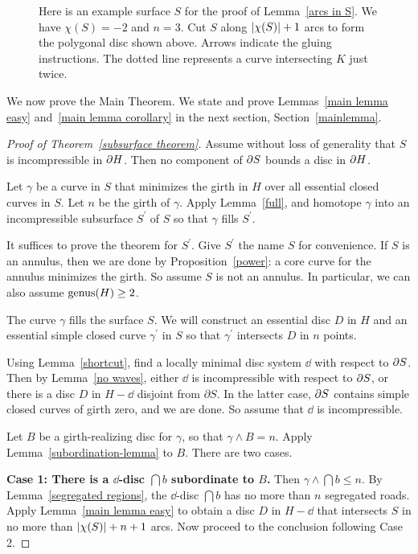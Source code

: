 \begin{figure}
\caption{Here is an example surface $S$ for the proof of Lemma~\ref{arcs in S}.  We have $\chi(S)=-2$ and $n=3$.  Cut $S$ along $| \chi (S) |+1$ arcs to form the polygonal disc shown above.  Arrows indicate the gluing instructions.  The dotted line represents a curve intersecting $K$ just twice.
}
\label{polygonarcs}
\end{figure}

We now prove the Main Theorem.  We state and prove 
Lemmas~\ref{main lemma easy} and~\ref{main lemma corollary} 
in the next section, Section~\ref{mainlemma}.

\begin{proof}[Proof of Theorem~\ref{subsurface theorem}]
Assume without loss of generality that $S$ is incompressible in $\partial H$.  Then no component of $\partial S$ bounds a disc in $\partial H$.

Let $\gamma$ be a curve in $S$ that minimizes the girth in $H$ over all essential closed curves in $S$.  Let $n$ be the girth of $\gamma$.  Apply Lemma~\ref{full}, and homotope $\gamma$ into an incompressible subsurface $S^\prime$ of $S$ so that $\gamma$ fills $S^\prime$.

It suffices to prove the theorem for $S^\prime$.  Give $S^\prime$ the name $S$ for convenience.  If $S$ is an annulus, then we are done by Proposition~\ref{power}: a core curve for the annulus minimizes the girth.  So assume $S$ is not an annulus.  In particular, we can also assume $\operatorname{genus}(H)\geq2$.

The curve $\gamma$ fills the surface $S$.  We will construct an essential disc $D$ in $H$ and an essential simple closed curve $\gamma^\prime$ in $S$ so that $\gamma^\prime$ intersects $D$ in $n$ points.

Using Lemma~\ref{shortcut}, find a locally minimal disc system $\dd$ with respect to $\partial S$.  Then by Lemma~\ref{no waves}, either $\dd$ is incompressible with respect to $\partial S$, or there is a disc $D$ in $H-\dd$ disjoint from $\partial S$.  In the latter case, $\partial S$ contains simple closed curves of girth zero, and we are done.  So assume that $\dd$ is incompressible.

Let $B$ be a girth-realizing disc for $\gamma$, so that $\gamma\wedge B=n$.  Apply Lemma~\ref{subordination-lemma} to $B$.  There are two cases.

\textbf{Case 1:  There is a $\dd$-disc $\dint{b}$ subordinate to $B$.}
Then $\gamma\wedge\dint{b}\leq n$.  By Lemma~\ref{segregated regions}, the $\dd$-disc $\dint{b}$ has no more than $n$ segregated roads.  Apply Lemma~\ref{main lemma easy} to obtain a disc $D$ in $H-\dd$ that intersects $S$ in no more than $| \chi (S) |+n+1$ arcs.  Now proceed to the conclusion following Case 2.


\end{proof}
